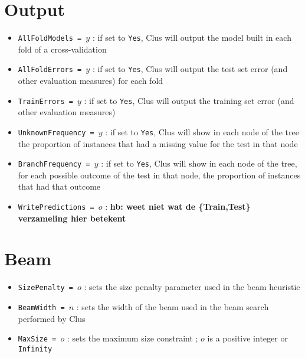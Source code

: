 \section{Output}

\begin{itemize}
\item {\tt AllFoldModels = $y$} : if set to {\tt Yes}, Clus will output the model built in each fold of a cross-validation
\item {\tt AllFoldErrors = $y$} : if set to {\tt Yes}, Clus will output the test set error (and other evaluation measures) for each fold
\item {\tt TrainErrors = $y$} : if set to {\tt Yes}, Clus will output the training set error (and other evaluation measures)
\item {\tt UnknownFrequency = $y$} : if set to {\tt Yes}, Clus will show in each node of the tree the proportion of instances that had a missing value for the test in that node
\item {\tt BranchFrequency = $y$} : if set to {\tt Yes}, Clus will show in each node of the tree, for each possible outcome of the test in that node, the proportion of instances that had that outcome
\item {\tt WritePredictions = $o$} : {\bf * hb: weet niet wat de \{Train,Test\} verzameling hier betekent}
\end{itemize}

\section{Beam}

\begin{itemize}
\item {\tt SizePenalty = $o$} : sets the size penalty parameter used in the beam heuristic \cite{beam-paper}
\item {\tt BeamWidth = $n$} : sets the width of the beam used in the beam search performed by Clus \cite{beam-paper}
\item {\tt MaxSize = $o$} : sets the maximum size constraint \cite{beam-paper}; $o$ is a positive integer or {\tt Infinity}
\end{itemize}

